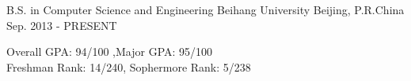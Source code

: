


\begin{cventries}


\cventry
{B.S. in Computer Science and Engineering} %
{Beihang University} %
{Beijing, P.R.China} %
{Sep. 2013 - PRESENT} %
{ %
\begin{cvitems}
\item {
	Overall 	GPA: 94/100 ,Major 		GPA: 95/100\\
	Freshman   	Rank: 14/240, Sophermore 	Rank: 5/238}
\end{cvitems}
}


\end{cventries}